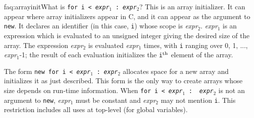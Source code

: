 \begin{faqa}{faq:arrayinit}{What is \texttt{\lb for i < {\it expr}$_1$ : {\it expr}$_2$\rb}?}
This is an array initializer.  It can appear where array initializers
appear in C, and it can appear as the argument to \texttt{new}.  It
declares an identifier (in this case, \texttt{i}) whose scope is
\textit{expr}$_2$.  \textit{expr}$_1$ is an expression which is
evaluated to an unsigned integer giving the desired size of the array.
The expression \textit{expr}$_2$ is evaluated \textit{expr}$_1$ times,
with \texttt{i} ranging over 0, 1, ..., \textit{expr}$_1$-1; the
result of each evaluation initializes the \texttt{i}$^{\rm th}$
element of the array.

The form \texttt{new \lb for i < {\it expr}$_1$ : {\it expr}$_2$\rb}
allocates space for a new array and initializes it as just described.
This form is the only way to create arrays whose size depends on
run-time information.  When \texttt{\lb for i < {\it expr}$_1$ : {\it
expr}$_2$\rb} is not an argument to \texttt{new}, \textit{expr}$_1$
must be constant and \textit{expr}$_2$ may not mention \texttt{i}.
This restriction includes all uses at top-level (for global
variables).
\end{faqa}

